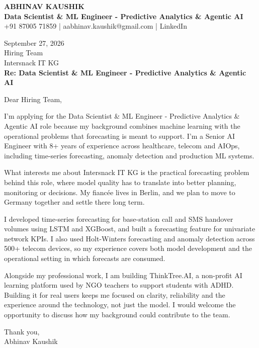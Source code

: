 \documentclass[10pt,a4paper]{article}
\begin{document}
\begin{center}
{\Large\bfseries ABHINAV KAUSHIK}\\[2pt]
{\bfseries Data Scientist \& ML Engineer - Predictive Analytics \& Agentic AI}\\[2pt]
+91 87005 71859 \quad | \quad aabhinav.kaushik@gmail.com \quad | \quad LinkedIn
\end{center}
\vspace{8pt}
September 27, 2026\\[6pt]
Hiring Team\\
Intersnack IT KG\\[4pt]
\textbf{Re: Data Scientist \& ML Engineer - Predictive Analytics \& Agentic AI}

Dear Hiring Team,

I’m applying for the Data Scientist \& ML Engineer - Predictive Analytics \& Agentic AI role because my background combines machine learning with the operational problems that forecasting is meant to support. I’m a Senior AI Engineer with 8+ years of experience across healthcare, telecom and AIOps, including time-series forecasting, anomaly detection and production ML systems.

What interests me about Intersnack IT KG is the practical forecasting problem behind this role, where model quality has to translate into better planning, monitoring or decisions. My fiancée lives in Berlin, and we plan to move to Germany together and settle there long term.

I developed time-series forecasting for base-station call and SMS handover volumes using LSTM and XGBoost, and built a forecasting feature for univariate network KPIs. I also used Holt-Winters forecasting and anomaly detection across 500+ telecom devices, so my experience covers both model development and the operational setting in which forecasts are consumed.

Alongside my professional work, I am building ThinkTree.AI, a non-profit AI learning platform used by NGO teachers to support students with ADHD. Building it for real users keeps me focused on clarity, reliability and the experience around the technology, not just the model. I would welcome the opportunity to discuss how my background could contribute to the team.

Thank you,\\
Abhinav Kaushik
\end{document}
